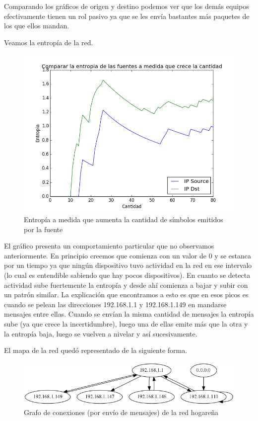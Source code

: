 Comparando los gr\'aficos de origen y destino podemos ver que los dem\'as equipos efectivamente tienen un rol pasivo ya que se les env\'ia bastantes m\'as paquetes de los que ellos mandan.\newline

Veamos la entrop\'ia de la red.

\begin{figure}[h!]
\centering
\includegraphics[width=0.7\linewidth]{imagenes/exp1/8entropiaIPDstyIPSource}
\caption{Entrop\'ia a medida que aumenta la cantidad de s\'imbolos emitidos por la fuente}
\label{exp1grafico1}
\end{figure}

El gr\'afico presenta un comportamiento particular que no observamos anteriormente. En principio creemos que comienza con un valor de 0 y se estanca por un tiempo ya que ning\'un dispositivo tuvo actividad en la red en ese intervalo (lo cual es entendible sabiendo que hay pocos dispositivos). En cuanto se detecta actividad sube fuertemente la entrop\'ia y desde ah\'i comienza a bajar y subir con un patr\'on similar. La explicaci\'on que encontramos a esto es que en esos picos es cuando se pelean las direcciones 192.168.1.1 y 192.168.1.149 en mandarse mensajes entre ellas. Cuando se env\'ian la misma cantidad de mensajes la entrop\'ia sube (ya que crece la incertidumbre), luego una de ellas emite m\'as que la otra y la entrop\'ia baja, luego se vuelven a nivelar y as\'i sucesivamente.\newline

El mapa de la red qued\'o representado de la siguiente forma.

\begin{figure}[h!]
\centering
\includegraphics[width=0.7\linewidth]{imagenes/exp1/IPnodos}
\caption{Grafo de conexiones (por env\'io de mensajes) de la red hogare\~na}
\label{exp1grafico1}
\end{figure}

